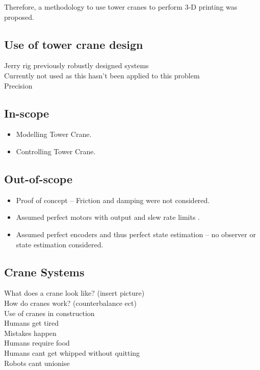 \documentclass{UoNMCHA}
\numberwithin{equation}{section}
\begin{document}
Therefore, a methodology to use tower cranes to perform 3-D printing was proposed.

\subsection*{Use of tower crane design}

Jerry rig previously robustly designed systems \\
Currently not used as this hasn’t been applied to this problem \\
Precision \\

\subsection{In-scope} \label{In-scope}

\begin{itemize}
	\item Modelling Tower Crane.
	\item Controlling Tower Crane.
\end{itemize}

\subsection{Out-of-scope} \label{Out-of-scope}

\begin{itemize}
	\item Proof of concept – Friction and damping were not considered.
	\item Assumed perfect motors with output and slew rate limits .
	\item Assumed perfect encoders and thus perfect state estimation – no observer or state estimation considered.
	
\end{itemize}
	
\subsection{Crane Systems} \label{Crane Systems}

What does a crane look like? (insert picture)\\
How do cranes work? (counterbalance ect)\\
Use of cranes in construction \\
Humans get tired \\
Mistakes happen\\
Humans require food\\ 
Humans cant get whipped without quitting\\
Robots cant unionise \\
\end{document}
